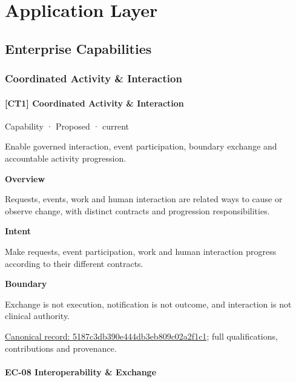 \chapter{Application Layer}

\section{Enterprise Capabilities}

\subsection{Coordinated Activity \& Interaction}

\subsubsection{[CT1] Coordinated Activity \& Interaction}

\label{element:5187c3db390e444db3eb809c02a2f1c1}
{\small Capability · Proposed · current}\par

Enable governed interaction, event participation, boundary exchange and accountable activity progression.



\textbf{Overview}



Requests, events, work and human interaction are related ways to cause or observe change, with distinct contracts and progression responsibilities.



\textbf{Intent}



Make requests, event participation, work and human interaction progress according to their different contracts.



\textbf{Boundary}



Exchange is not execution, notification is not outcome, and interaction is not clinical authority.


{\footnotesize \href{../../../../continuum/strategy/capability/5187c3db390e444db3eb809c02a2f1c1.md}{Canonical record: 5187c3db390e444db3eb809c02a2f1c1}; full qualifications, contributions and provenance.}\par
\subsubsection{EC-08 Interoperability \& Exchange}

